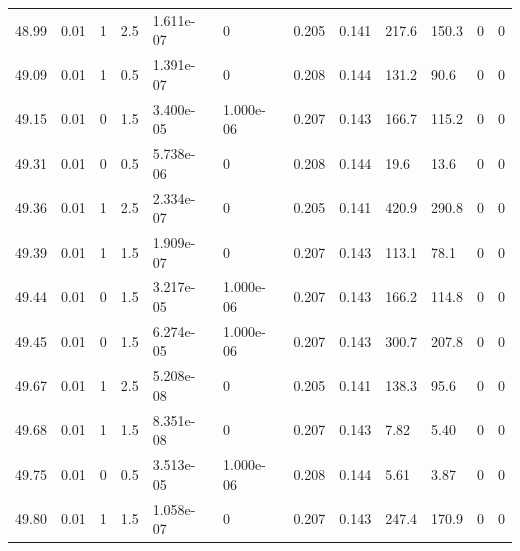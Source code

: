 \documentclass[preview]{standalone}
\begin{document}
{{{{{{{{{{{{{{{\begin{tabular}{L{1.2cm}C{1.2cm} C{0.3cm}C{0.5cm} C{1.4cm}C{1.4cm} C{1.4cm}C{1.4cm} C{1.6cm}C{1.6cm} C{1.6cm}C{1.6cm}}
  48.99  &  0.01  & 1     & 2.5 &  1.611e-07  & 0  &  0.205&   0.141& 217.6 & 150.3   &  0 & 0  \\ 
  49.09  &  0.01  & 1     & 0.5 &  1.391e-07  & 0  &  0.208&   0.144& 131.2 & 90.6   &  0 & 0  \\ 
  49.15  &  0.01  & 0     & 1.5 &  3.400e-05  & 1.000e-06  &  0.207&   0.143& 166.7 & 115.2   &  0 & 0  \\ 
  49.31  &  0.01  & 0     & 0.5 &  5.738e-06  & 0  &  0.208&   0.144& 19.6 & 13.6   &  0 & 0  \\ 
  49.36  &  0.01  & 1     & 2.5 &  2.334e-07  & 0  &  0.205&   0.141& 420.9 & 290.8   &  0 & 0  \\ 
  49.39  &  0.01  & 1     & 1.5 &  1.909e-07  & 0  &  0.207&   0.143& 113.1 & 78.1   &  0 & 0  \\ 
  49.44  &  0.01  & 0     & 1.5 &  3.217e-05  & 1.000e-06  &  0.207&   0.143& 166.2 & 114.8   &  0 & 0  \\ 
  49.45  &  0.01  & 0     & 1.5 &  6.274e-05  & 1.000e-06  &  0.207&   0.143& 300.7 & 207.8   &  0 & 0  \\ 
  49.67  &  0.01  & 1     & 2.5 &  5.208e-08  & 0  &  0.205&   0.141& 138.3 & 95.6   &  0 & 0  \\ 
  49.68  &  0.01  & 1     & 1.5 &  8.351e-08  & 0  &  0.207&   0.143& 7.82 & 5.40   &  0 & 0  \\ 
  49.75  &  0.01  & 0     & 0.5 &  3.513e-05  & 1.000e-06  &  0.208&   0.144& 5.61 & 3.87   &  0 & 0  \\ 
  49.80  &  0.01  & 1     & 1.5 &  1.058e-07  & 0  &  0.207&   0.143& 247.4 & 170.9   &  0 & 0  \\ 
\hline 
\end{tabular} 

}}}}}}}}}}}}}}}
\end{document}

